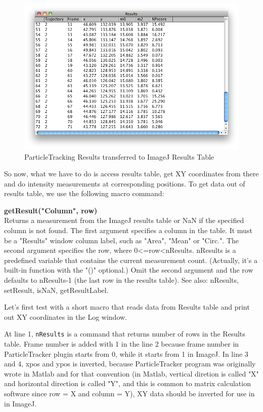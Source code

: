 \documentclass[11pt,a4paper,oneside]{report}
\newenvironment{indentCom}%
{\begin{list}{}%
         {\setlength{\leftmargin}{1em}}%
         \item[]%
}
{\end{list}}
\newcommand{\ilcom}[1]{\texttt{\small#1}}
\begin{document}
\begin{figure}[htbp]
\begin{center}
\includegraphics[scale=0.4]{fig/fig253_TrackingResultsInResultsTabel.png}
\caption{ParticleTracking Results transferred to ImageJ Results Table}
\label{fig:particletrackingTransferred}
\end{center}
\end{figure}

So now, what we have to do is access results table, 
get XY coordinates from there and do intensity measurements at corresponding positions. 
To get data out of results table, we use the following macro command:
\begin{indentCom}
\textbf{getResult("Column", row)}\\
Returns a measurement from the ImageJ results table or NaN if the specified column is not found. 
The first argument specifies a column in the table. 
It must be a "Results" window column label, such as "Area", "Mean" or "Circ.". 
The second argument specifies the row, where 0<=row<nResults. 
nResults is a predefined variable that contains the current measurement count. 
(Actually, it's a built-in function with the "()" optional.) 
Omit the second argument and the row defaults to nResults-1 (the last row in the results table). 
See also: nResults, setResult, isNaN, getResultLabel.
\end{indentCom}
Let's first test with a short macro that reads data from Results table and 
print out XY coordinates in the Log window. 



At line 1, \ilcom{nResults} is a command that returns number of rows in the Results table. 
Frame number is added with 1 in the line 2  because frame number in ParticleTracker plugin starts from 0, 
while it starts from 1 in ImageJ. 
In line 3 and 4, xpos and ypos is inverted, 
because ParticleTracker program was originally wrote in Matlab and for that convention 
(in Matlab, vertical diretion is called "X" and horizontal direction is called "Y", 
and this is common to matrix calculation software since row = X and column = Y), 
XY data should be inverted for use in in ImageJ. 
\end{document}

